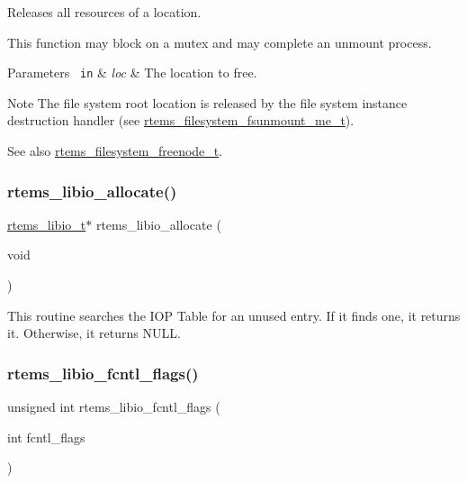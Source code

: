 Releases all resources of a location. 

This function may block on a mutex and may complete an unmount process.


\begin{DoxyParams}[1]{Parameters}
\mbox{\texttt{ in}}  & {\em loc} & The location to free.\\
\hline
\end{DoxyParams}
\begin{DoxyNote}{Note}
The file system root location is released by the file system instance destruction handler (see \mbox{\hyperlink{group__LibIOFSOps_ga2f385e23e8448df4e51240f8377aac43}{rtems\+\_\+filesystem\+\_\+fsunmount\+\_\+me\+\_\+t}}).
\end{DoxyNote}
\begin{DoxySeeAlso}{See also}
\mbox{\hyperlink{group__LibIOFSOps_gae151461f446627c1bee2a12decf99745}{rtems\+\_\+filesystem\+\_\+freenode\+\_\+t}}. 
\end{DoxySeeAlso}
\mbox{\label{group__LibIOInternal_ga2021231771d73c426958cf0bb7400666}} 
\subsubsection{\texorpdfstring{rtems\_libio\_allocate()}{rtems\_libio\_allocate()}}
{\footnotesize\ttfamily \mbox{\hyperlink{structrtems__libio__tt}{rtems\+\_\+libio\+\_\+t}}$\ast$ rtems\+\_\+libio\+\_\+allocate (\begin{DoxyParamCaption}\item[{void}]{ }\end{DoxyParamCaption})}

This routine searches the I\+OP Table for an unused entry. If it finds one, it returns it. Otherwise, it returns N\+U\+LL. \mbox{\label{group__LibIOInternal_ga0f1f1dcc65233793d22aa713c4709020}} 
\subsubsection{\texorpdfstring{rtems\_libio\_fcntl\_flags()}{rtems\_libio\_fcntl\_flags()}}
{\footnotesize\ttfamily unsigned int rtems\+\_\+libio\+\_\+fcntl\+\_\+flags (\begin{DoxyParamCaption}\item[{int}]{fcntl\+\_\+flags }\end{DoxyParamCaption})}

